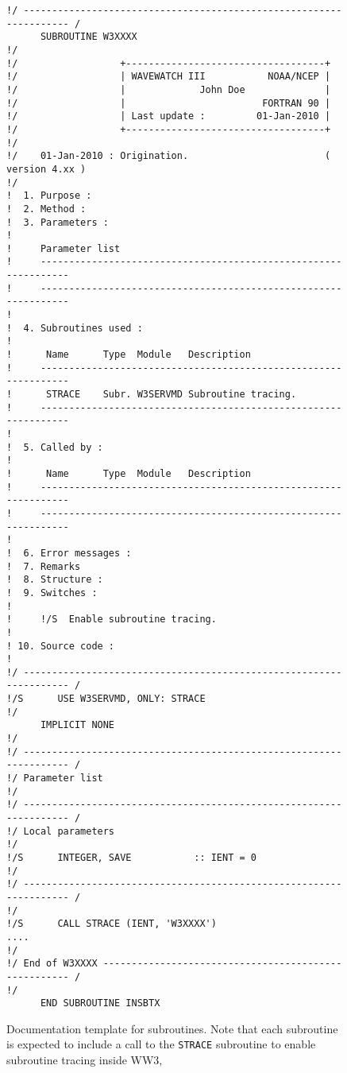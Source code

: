 \documentclass[12pt]{article}
\newcommand{\ws}{WW3}
\newcommand{\code}{\tt}
\newcounter{myfigno}[section]
\newenvironment{myfig}[1]{\begin{figure}[#1]
                         \refstepcounter{myfigno}}                       
                        {\end{figure}}
\newcommand{\myfcap}[1]{\begin{list}{\ff Fig. \themyfigno\ :~\hfill}
                       {\rightmargin 8mm \labelsep 0mm
                        \labelwidth 8mm \leftmargin 8mm
                        \topsep 0mm \parskip 0mm \partopsep 0mm }
                        \item \ff #1 \end{list}}
\renewcommand{\themyfigno}{\thesection.\arabic{myfigno}}
\begin{document}
\begin{myfig}{tbp}
\begin{center}
\begin{minipage}[c]{4.5in}
\vspace{-10mm}
{\scriptsize \begin{verbatim}
!/ ------------------------------------------------------------------- /
      SUBROUTINE W3XXXX
!/
!/                  +-----------------------------------+
!/                  | WAVEWATCH III           NOAA/NCEP |
!/                  |             John Doe              |
!/                  |                        FORTRAN 90 |
!/                  | Last update :         01-Jan-2010 |
!/                  +-----------------------------------+
!/
!/    01-Jan-2010 : Origination.                        ( version 4.xx )
!/
!  1. Purpose :
!  2. Method :
!  3. Parameters :
!
!     Parameter list
!     ----------------------------------------------------------------
!     ----------------------------------------------------------------
!
!  4. Subroutines used :
!
!      Name      Type  Module   Description
!     ----------------------------------------------------------------
!      STRACE    Subr. W3SERVMD Subroutine tracing.
!     ----------------------------------------------------------------
!
!  5. Called by :
!
!      Name      Type  Module   Description
!     ----------------------------------------------------------------
!     ----------------------------------------------------------------
!
!  6. Error messages :
!  7. Remarks 
!  8. Structure :
!  9. Switches :
!
!     !/S  Enable subroutine tracing.
!
! 10. Source code :
!
!/ ------------------------------------------------------------------- /
!/S      USE W3SERVMD, ONLY: STRACE
!/
      IMPLICIT NONE
!/
!/ ------------------------------------------------------------------- /
!/ Parameter list
!/
!/ ------------------------------------------------------------------- /
!/ Local parameters
!/
!/S      INTEGER, SAVE           :: IENT = 0
!/
!/ ------------------------------------------------------------------- /
!/
!/S      CALL STRACE (IENT, 'W3XXXX')
....
!/
!/ End of W3XXXX ----------------------------------------------------- /
!/
      END SUBROUTINE INSBTX
\end{verbatim}}
\end{minipage}
\end{center}

\myfcap{Documentation template for subroutines. Note that each subroutine is
        expected to include a call to the {\code STRACE} subroutine to enable
        subroutine tracing inside \ws,}
\label{fig:docu_subr}
\end{myfig}
\end{document}
